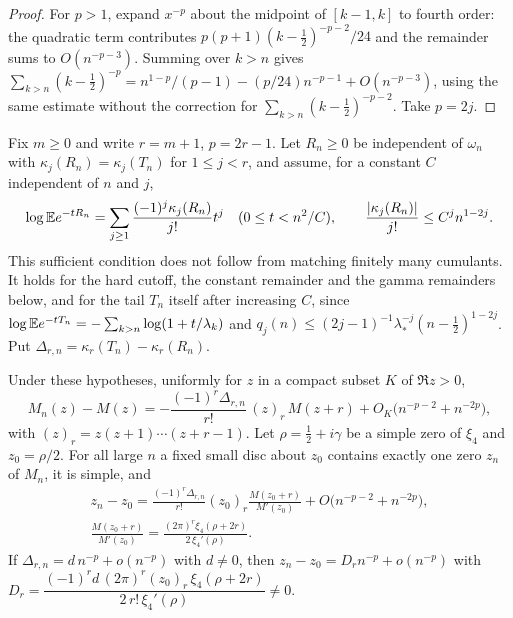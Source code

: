 \begin{proof}
For $p>1$, expand $x^{-p}$ about the midpoint of $[k-1,k]$ to fourth order: the quadratic term contributes $p(p+1)(k-\frac12)^{-p-2}/24$ and the remainder sums to $O(n^{-p-3})$. Summing over $k>n$ gives $\sum_{k>n}(k-\tfrac12)^{-p}=n^{1-p}/(p-1)-(p/24)n^{-p-1}+O(n^{-p-3})$, using the same estimate without the correction for $\sum_{k>n}(k-\frac12)^{-p-2}$. Take $p=2j$.
\end{proof}

Fix $m\ge0$ and write $r=m+1$, $p=2r-1$. Let $R_n\ge0$ be independent of $\omega_n$ with $\kappa_j(R_n)=\kappa_j(T_n)$ for $1\le j<r$, and assume, for a constant $C$ independent of $n$ and $j$,
\begin{equation}\label{tr:eq:A}
\log\mathbb{E} e^{-tR_n}=\sum_{j\ge1}\frac{(-1)^j\kappa_j(R_n)}{j!}t^j\quad(0\le t<n^2/C),\qquad\frac{|\kappa_j(R_n)|}{j!}\le C^jn^{1-2j}.
\end{equation}
This sufficient condition does not follow from matching finitely many cumulants. It holds for the hard cutoff, the constant remainder and the gamma remainders below, and for the tail $T_n$ itself after increasing $C$, since $\log\mathbb{E} e^{-tT_n}=-\sum_{k>n}\log(1+t/\lambda_k)$ and $q_j(n)\le(2j-1)^{-1}\lambda_*^{-j}(n-\frac12)^{1-2j}$. Put $\Delta_{r,n}=\kappa_r(T_n)-\kappa_r(R_n)$.

\begin{theorem}\label{tr:thm:drift}
Under these hypotheses, uniformly for $z$ in a compact subset $K$ of $\Re z>0$,
\begin{equation}\label{tr:eq:Mn}
M_n(z)-M(z)=-\frac{(-1)^r\Delta_{r,n}}{r!}\,(z)_r\,M(z+r)+O_K\big(n^{-p-2}+n^{-2p}\big),
\end{equation}
with $(z)_r=z(z+1)\cdots(z+r-1)$.
Let $\rho=\frac12+i\gamma$ be a simple zero of $\xi_4$ and $z_0=\rho/2$. For all large $n$ a fixed small disc about $z_0$ contains exactly one zero $z_n$ of $M_n$, it is simple, and
\begin{equation}\label{tr:eq:zn}
\begin{gathered}z_n-z_0=\frac{(-1)^r\Delta_{r,n}}{r!}(z_0)_r\frac{M(z_0+r)}{M'(z_0)}+O\big(n^{-p-2}+n^{-2p}\big),\\
\frac{M(z_0+r)}{M'(z_0)}=\frac{(2\pi)^r\xi_4(\rho+2r)}{2\,\xi_4'(\rho)}.
\end{gathered}\end{equation}
If $\Delta_{r,n}=d\,n^{-p}+o(n^{-p})$ with $d\ne0$, then $z_n-z_0=D_rn^{-p}+o(n^{-p})$ with $D_r=\dfrac{(-1)^rd\,(2\pi)^r(z_0)_r\,\xi_4(\rho+2r)}{2\,r!\,\xi_4'(\rho)}\ne0$.
\end{theorem}

